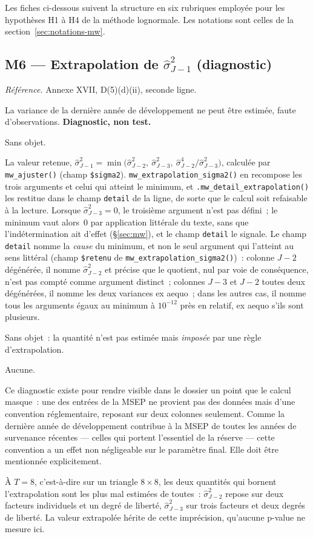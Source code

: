 \documentclass[a4paper,11pt]{article}
\newcommand{\code}[1]{\texttt{\small #1}}
\newcommand{\refl}[1]{{\small\textcolor{maincolor!70!black}{\textit{Référence.} #1}}\par\smallskip}
\newcounter{ficheid}
\newenvironment{fiche}[1]{%
  \stepcounter{ficheid}%
  \phantomsection
  \subsection{#1}%
  \label{fiche:\theficheid}%
}{%
  \end{description}\vspace{0.5em}%
}
\newcommand{\Cadre}{%
  \begin{description}[leftmargin=0pt, style=unboxed, itemsep=3pt, topsep=3pt, parsep=2pt]%
  \item[\textcolor{financeblue}{\textbf{1. Cadre, notations et hypothèses de validité (non testées).}}]}
\newcommand{\Hzero}{\item[\textcolor{financeblue}{\textbf{2. Hypothèse nulle.}}]}
\newcommand{\Stat}{\item[\textcolor{financeblue}{\textbf{3. Statistique de test.}}]}
\newcommand{\Loi}{\item[\textcolor{financeblue}{\textbf{4. Loi sous $H_0$.}}]}
\newcommand{\Pval}{\item[\textcolor{financeblue}{\textbf{5. p-value.}}]}
\newcommand{\Usage}{\item[\textcolor{financeblue}{\textbf{6. Usage et limites.}}]}
\begin{document}
Les fiches ci-dessous suivent la structure en six rubriques employée pour les
hypothèses H1 à H4 de la méthode lognormale. Les notations sont celles de la
section~\ref{sec:notations-mw}.

\begin{fiche}{M6 --- Extrapolation de $\hat\sigma^2_{J-1}$ (diagnostic)}
\label{mw:m6sig}
\refl{Annexe XVII, D(5)(d)(ii), seconde ligne.}
\Cadre
La variance de la dernière année de développement ne peut être estimée, faute
d'observations. \textbf{Diagnostic, non test.}
\Hzero
Sans objet.
\Stat
La valeur retenue,
$\hat\sigma^2_{J-1} = \min\big(\hat\sigma^2_{J-2},\ \hat\sigma^2_{J-3},\
\hat\sigma^4_{J-2}/\hat\sigma^2_{J-3}\big)$, calculée par \code{mw\_ajuster()}
(champ \code{\$sigma2}). \code{mw\_extrapolation\_sigma2()} en recompose les
trois arguments et celui qui atteint le minimum, et
\code{.mw\_detail\_extrapolation()} les restitue dans le champ \code{detail} de
la ligne, de sorte que le calcul soit refaisable à la lecture. Lorsque
$\hat\sigma^2_{J-3} = 0$, le troisième argument n'est pas défini~; le minimum
vaut alors~$0$ par application littérale du texte, sans que l'indétermination
ait d'effet (§\ref{sec:mw}), et le champ \code{detail} le signale. Le champ
\code{detail} nomme la \emph{cause} du minimum, et non le seul argument qui
l'atteint au sens littéral (champ \code{\$retenu} de
\code{mw\_extrapolation\_sigma2()})~: colonne $J-2$ dégénérée, il nomme
$\hat\sigma^2_{J-2}$ et précise que le quotient, nul par voie de conséquence,
n'est pas compté comme argument distinct~; colonnes $J-3$ et $J-2$ toutes deux
dégénérées, il nomme les deux variances ex aequo~; dans les autres cas, il
nomme tous les arguments égaux au minimum à $10^{-12}$ près en relatif, ex
aequo s'ils sont plusieurs.
\Loi
Sans objet~: la quantité n'est pas estimée mais \emph{imposée} par une règle
d'extrapolation.
\Pval
Aucune.
\Usage
Ce diagnostic existe pour rendre visible dans le dossier un point que le calcul
masque~: une des entrées de la MSEP ne provient pas des données mais d'une
convention réglementaire, reposant sur deux colonnes seulement. Comme la
dernière année de développement contribue à la MSEP de toutes les années de
survenance récentes --- celles qui portent l'essentiel de la réserve --- cette
convention a un effet non négligeable sur le paramètre final. Elle doit être
mentionnée explicitement.

À $T = 8$, c'est-à-dire sur un triangle $8\times8$, les deux quantités qui
bornent l'extrapolation sont les plus mal estimées de toutes~: $\hat\sigma^2_{J-2}$
repose sur deux facteurs individuels et un degré de liberté,
$\hat\sigma^2_{J-3}$ sur trois facteurs et deux degrés de liberté. La valeur
extrapolée hérite de cette imprécision, qu'aucune p-value ne mesure ici.


\end{fiche}
\end{document}
